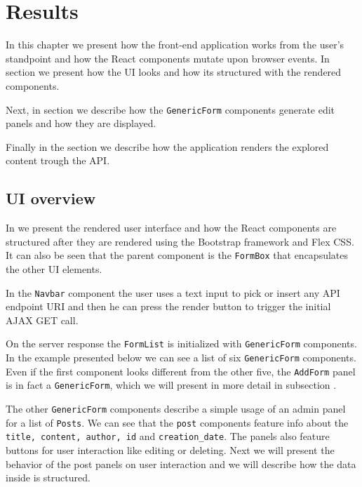 \chapter{Results}
\label{chapter:results}

In this chapter we present how the front-end application works from the user's standpoint and how the React components mutate upon browser events. In section  we present how the UI looks and how its structured with the rendered components.

Next, in section  we describe how the \texttt{GenericForm} components generate edit panels and how they are displayed.

Finally in the  section we describe how the application renders the explored content trough the API.

\section{UI overview}
\label{sec:ui-overview}

In  we present the rendered user interface and how the React components are structured after they are rendered using the Bootstrap framework and Flex CSS. It can also be seen that the parent component is the \texttt{FormBox} that encapsulates the other UI elements.

In the \texttt{Navbar} component the user uses a text input to pick or insert any API endpoint URI and then he can press the render button to trigger the initial AJAX GET call. 

On the server response the \texttt{FormList} is initialized with \texttt{GenericForm} components. In the example presented below we can see a list of six \texttt{GenericForm} components. Even if the first component looks different from the other five, the \texttt{AddForm} panel is in fact a \texttt{GenericForm}, which we will present in more detail in subsection .

The other \texttt{GenericForm} components describe a simple usage of an admin panel for a list of \texttt{Posts}. We can see that the \texttt{post} components feature info about the \texttt{title, content, author, id} and \texttt{creation\_date}. The panels also feature buttons for user interaction like editing or deleting. Next we will present the behavior of the post panels on user interaction and we will describe how the data inside is structured.

